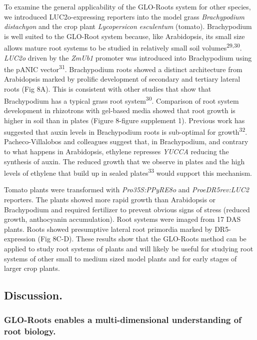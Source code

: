 \documentclass[]{article}
\begin{document}
To examine the general applicability of the GLO-Roots system for other
species, we introduced LUC2o-expressing reporters into the model grass
\emph{Brachypodium distachyon} and the crop plant \emph{Lycopersicon
esculentum} (tomato). Brachypodium is well suited to the GLO-Root system
because, like Arabidopsis, its small size allows mature root systems to
be studied in relatively small soil volumes\textsuperscript{29,30}.
\emph{LUC2o} driven by the \emph{ZmUb1} promoter was introduced into
Brachypodium using the pANIC vector\textsuperscript{31}. Brachypodium
roots showed a distinct architecture from Arabidopsis marked by prolific
development of secondary and tertiary lateral roots (Fig 8A). This is
consistent with other studies that show that Brachypodium has a typical
grass root system\textsuperscript{30}. Comparison of root system
development in rhizotrons with gel-based media showed that root growth
is higher in soil than in plates (Figure 8-figure supplement 1).
Previous work has suggested that auxin levels in Brachypodium roots is
sub-optimal for growth\textsuperscript{32}. Pacheco-Villalobos and
colleagues suggest that, in Brachypodium, and contrary to what happens
in Arabidopsis, ethylene represses \emph{YUCCA} reducing the synthesis
of auxin. The reduced growth that we observe in plates and the high
levels of ethylene that build up in sealed plates\textsuperscript{33}
would support this mechanism.

Tomato plants were transformed with \emph{Pro35S:PPyRE8o} and
\emph{ProeDR5rev:LUC2} reporters. The plants showed more rapid growth
than Arabidopsis or Brachypodium and required fertilizer to prevent
obvious signs of stress (reduced growth, anthocyanin accumulation). Root
systems were imaged from 17 DAS plants. Roots showed presumptive lateral
root primordia marked by DR5-expression (Fig 8C-D). These results show
that the GLO-Roots method can be applied to study root systems of plants
and will likely be useful for studying root systems of other small to
medium sized model plants and for early stages of larger crop plants.

\subsection{Discussion.}\label{discussion.}

\subsubsection{GLO-Roots enables a multi-dimensional understanding of
root
biology.}\label{glo-roots-enables-a-multi-dimensional-understanding-of-root-biology.}
\end{document}
